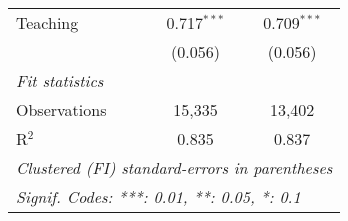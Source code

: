 \begin{tabular}{lcc}
   Teaching                & 0.717$^{***}$  & 0.709$^{***}$\\   
                           & (0.056)        & (0.056)\\   
   \midrule
   \emph{Fit statistics}\\
   Observations            & 15,335         & 13,402\\  
   R$^2$                   & 0.835          & 0.837\\  
   \midrule \midrule
   \multicolumn{3}{l}{\emph{Clustered (FI) standard-errors in parentheses}}\\
   \multicolumn{3}{l}{\emph{Signif. Codes: ***: 0.01, **: 0.05, *: 0.1}}\\
\end{tabular}
\par\endgroup


